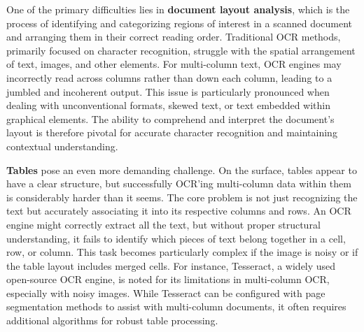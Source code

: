 One of the primary difficulties lies in \textbf{document layout analysis}, which is the process of identifying and categorizing regions of interest in a scanned document and arranging them in their correct reading order. Traditional OCR methods, primarily focused on character recognition, struggle with the spatial arrangement of text, images, and other elements. For multi-column text, OCR engines may incorrectly read across columns rather than down each column, leading to a jumbled and incoherent output. This issue is particularly pronounced when dealing with unconventional formats, skewed text, or text embedded within graphical elements. The ability to comprehend and interpret the document's layout is therefore pivotal for accurate character recognition and maintaining contextual understanding.

\textbf{Tables} pose an even more demanding challenge. On the surface, tables appear to have a clear structure, but successfully OCR'ing multi-column data within them is considerably harder than it seems. The core problem is not just recognizing the text but accurately associating it into its respective columns and rows. An OCR engine might correctly extract all the text, but without proper structural understanding, it fails to identify which pieces of text belong together in a cell, row, or column. This task becomes particularly complex if the image is noisy or if the table layout includes merged cells. For instance, Tesseract, a widely used open-source OCR engine, is noted for its limitations in multi-column OCR, especially with noisy images. While Tesseract can be configured with page segmentation methods to assist with multi-column documents, it often requires additional algorithms for robust table processing.

